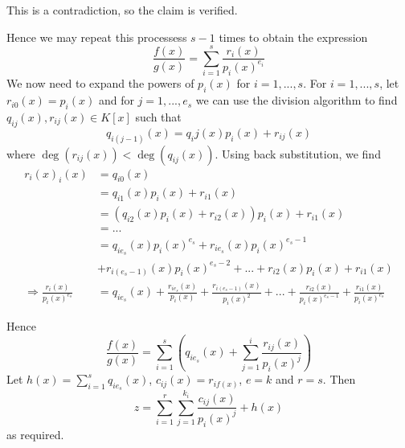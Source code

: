 \begin{solution}
\begin{enumerate}[(i)]
This is a contradiction, so the claim is verified. 

Hence we may 
repeat this processess $s-1$ times to obtain the expression
$$\frac{f(x)}{g(x)} = \sum^s_{i=1}\frac{r_i(x)}{p_i(x)^{e_i}}$$ 
We now need to expand the powers of $p_i(x)$ for $i=1,...,s$. 
For $i=1,...,s$, let $r_{i0}(x) = p_i(x)$  and for $j=1,...,e_s$ 
we can use the division algorithm to find $q_{ij}(x),r_{ij}(x) \in K[x]$ 
such that $$q_{i(j-1)}(x) = q_ij(x)p_i(x) + r_{ij}(x)$$ where $\deg(r_{ij}(x)) < \deg(q_{ij}(x))$.
Using back substitution, we find 
\begin{align*}
r_i(x)_i(x) &= q_{i0}(x) \\
&= q_{i1}(x)p_i(x) + r_{i1}(x) \\
&= (q_{i2}(x)p_i(x)+r_{i2}(x))p_i(x) + r_{i1}(x) \\
&= ... \\
&= q_{ie_{s}}(x)p_i(x)^{e_s} + r_{ie_{s}}(x)p_i(x)^{e_s -1} \\
&+ r_{i(e_s -1)}(x)p_i(x)^{e_s -2} + ... + r_{i2}(x)p_i(x) + r_{i1}(x) \\
\Longrightarrow \frac{r_i(x)}{p_i(x)^{e_s}} &= q_{ie_s}(x) + 
\frac{r_{ie_s}(x)}{p_i(x)}+ \frac{r_{i(e_s -1)}(x)}{p_i(x)^2} + 
...+ \frac{r_{i2}(x)}{p_i(x)^{e_s - 1}} + \frac{r_{i1}(x)}{p_i(x)^{e_s}}
\end{align*}

Hence $$\frac{f(x)}{g(x)} = \sum^s_{i=1}(q_{ie_s}(x) + \sum^i_{j=1}  \frac{r_{ij}(x)}{p_i(x)^j})$$
Let $h(x) = \sum^s_{i=1}q_{ie_s}(x)$, $c_{ij}(x)=r_{if(x)}$, $e=k$ and $r = s$. Then 
$$z = \sum^r_{i = 1} \sum^{k_i}_{j=1} \frac{c_{ij}(x)}{p_i(x)^j} + h(x)$$ as required.

\end{enumerate}


\end{solution}



